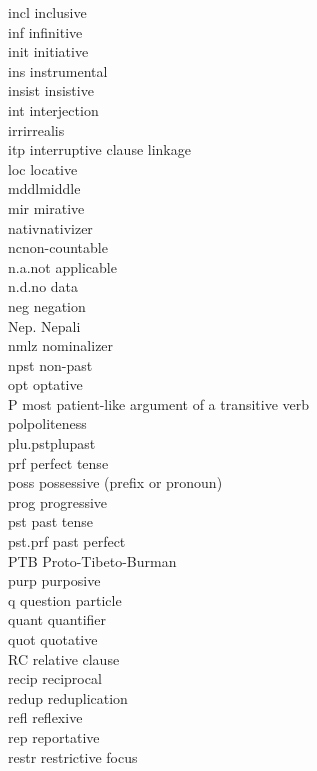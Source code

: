 {\begin{tabbing}
{\sc incl}\> inclusive\\
{\sc inf} \> infinitive\\
{\sc init} \> initiative\\
{\sc ins} \> instrumental\\
{\sc insist} \> insistive\\
{\sc int} \> interjection\\
{\sc irr}\>irrealis\\
{\sc itp} \> interruptive clause linkage\\
{\sc loc} 	 \> locative \\
{\sc mddl}\>middle\\
{\sc mir} \> mirative\\
{\sc nativ}\>nativizer\\
{\sc nc}\>non-countable\\
n.a.\>not applicable\\
n.d.\>no data\\
{\sc neg} \>	negation\\
Nep. \>	Nepali\\
{\sc nmlz} \>	nominalizer\\
{\sc npst} \> non-past\\
{\sc opt} \> optative\\
P 	\> most patient-like argument of a transitive verb\\
{\sc pol}\>politeness\\
{\sc plu.pst}\>plupast\\
{\sc prf}\> perfect tense\\
{\sc poss} \> possessive (prefix or pronoun)\\
{\sc prog} \> progressive\\
{\sc pst} \> past tense\\
{\sc pst.prf} \> past perfect\\
PTB \> Proto-Tibeto-Burman\\
{\sc purp}\> purposive\\
{\sc q} \> question particle\\
{\sc quant} \> quantifier\\
{\sc quot} \> quotative\\
{\sc RC} \> relative clause\\
{\sc recip} \> reciprocal\\
{\sc redup}\> reduplication\\
{\sc refl}\> reflexive\\
{\sc rep} \> reportative\\
{\sc restr}\> restrictive focus\\

\end{tabbing}}
